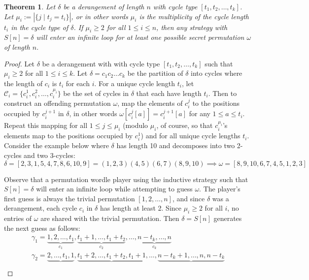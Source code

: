\documentclass[article]{amsart}
\theoremstyle{plain}
\newtheorem{theorem}{Theorem}
\begin{document}
\begin{theorem}
    Let $\delta$ be a derangement of length $n$ with cycle type $[t_1, t_2, \dots, t_k]$. Let $\mu_i := |\{ j \mid t_j = t_i \}|$, or in other words $\mu_i$ is the multiplicity of the cycle length $t_i$ in the cycle type of $\delta$. If $\mu_i \geq 2$ for all $1 \leq i \leq n$, then any strategy with $S[n] = \delta$ will enter an infinite loop for at least one possible secret permutation $\omega$ of length $n$.
\end{theorem}

\begin{proof}
Let $\delta$ be a derangement with with cycle type $[t_1, t_2, \dots, t_k]$ such that $\mu_i \geq 2$ for all $1 \leq i \leq k$. Let $\delta = c_1 c_2 \dots c_k$ be the partition of $\delta$ into cycles where the length of $c_i$ is $t_i$ for each $i$. 
For a unique cycle length $t_i$, let $\mathcal{C}_i = \{c_i^1, c_i^2, \dots, c_i^{\mu_i} \}$ be the set of cycles in $\delta$ that each have length $t_i$. Then to construct an offending permutation $\omega$, map the elements of $c_i^j$ to the positions occupied by $c_i^{j+1}$ in $\delta$, in other words $\omega[c_i^j[a]] = c_i^{j+1}[a]$ for any $1 \leq a \leq t_i$. Repeat this mapping for all $1 \leq j \leq \mu_i$ (modulo $\mu_i$, of course, so that $c_i^{\mu_i}$'s elements map to the positions occupied by $c_i^1$) and for all unique cycle lengths $t_i$. Consider the example below where $\delta$ has length 10 and decomposes into two 2-cycles and two 3-cycles:
\[ 
\delta = [2,3,1,5,4,7,8,6,10,9] 
= (1,2,3)(4,5)(6,7)(8,9,10) 
\implies \omega = [8,9,10,6,7,4,5,1,2,3]
\]

Observe that a permutation wordle player using the inductive strategy such that $S[n] = \delta$ will enter an infinite loop while attempting to guess $\omega$. The player's first guess is always the trivial permutation $[1,2,\dots, n]$, and since $\delta$ was a derangement, each cycle $c_i$ in $\delta$ has length at least 2. Since $\mu_i \geq 2$ for all $i$, no entries of $\omega$ are shared with the trivial permutation. Then $\delta = S[n]$ generates the next guess as follows:
\[
\begin{array}{cc}   
\gamma_1 = \underbrace{1,2,\dots,t_1}_{c_1},\underbrace{t_1 + 1, \dots, t_1 + t_2}_{c_2}, \dots, \underbrace{n - t_k, \dots, n}_{c_k}  \\  
\gamma_2 = \underbrace{2,\dots,t_1,1}_{},\underbrace{t_1 + 2, \dots, t_1 + t_2, t_1+1}_{}, \dots, \underbrace{n - t_k + 1, \dots, n, n-t_k}_{}  \\
\end{array}
\]


\end{proof}
\end{document}
